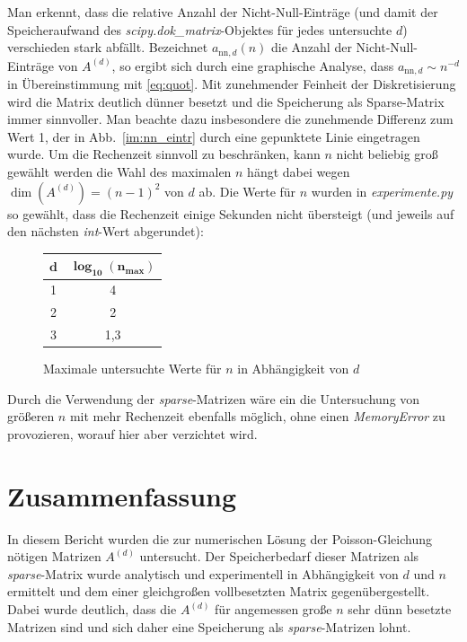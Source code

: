 \documentclass[smallheadings]{scrartcl}
\numberwithin{equation}{section}
\begin{document}
Man erkennt, dass die relative Anzahl der Nicht-Null-Einträge (und damit der Speicheraufwand des \textit{scipy.dok\_matrix}-Objektes für jedes untersuchte $d$) verschieden stark abfällt. Bezeichnet $a_{\text{nn},d}(n)$ die Anzahl der 
Nicht-Null-Einträge von $A^{(d)}$, so ergibt sich durch eine graphische Analyse, dass $a_{\text{nn},d}\sim n^{-d}$ in Übereinstimmung mit \eqref{eq:quot}. Mit zunehmender Feinheit der Diskretisierung wird die Matrix deutlich dünner besetzt und die Speicherung als Sparse-Matrix immer sinnvoller. Man beachte dazu insbesondere die zunehmende Differenz zum Wert 1, der in Abb.~\ref{im:nn_eintr} durch eine gepunktete Linie eingetragen wurde. 
Um die Rechenzeit sinnvoll zu beschränken, kann $n$ nicht beliebig groß gewählt werden die Wahl des maximalen $n$ hängt dabei wegen $\dim(A^{(d)})=(n-1)^2$ von $d$ ab. Die Werte für $n$ wurden in \textit{experimente.py} so gewählt, dass die Rechenzeit einige Sekunden nicht übersteigt (und jeweils auf den nächsten \textit{int}-Wert abgerundet):
\begin{figure}[H]
\centering
\begin{tabular}{|c|c|}
\hline
$\boldsymbol{d}$ & $\boldsymbol{\log_{10}(n_{max})}$\\
\hline
1 & 4\\
\hline
2 & 2\\
\hline
3 & 1,3\\
\hline

\end{tabular}
\caption{Maximale untersuchte Werte für $n$ in Abhängigkeit von $d$}
\end{figure}
Durch die Verwendung der \textit{sparse}-Matrizen wäre ein die Untersuchung von größeren $n$ mit mehr Rechenzeit ebenfalls möglich, ohne einen \textit{MemoryError} zu provozieren, worauf hier aber verzichtet wird.

\section{Zusammenfassung}

In diesem Bericht wurden die zur numerischen Lösung der Poisson-Gleichung nötigen Matrizen $A^{(d)}$ untersucht. Der Speicherbedarf dieser Matrizen als \textit{sparse}-Matrix wurde analytisch und experimentell in Abhängigkeit von $d$ und $n$ ermittelt und dem einer gleichgroßen vollbesetzten Matrix gegenübergestellt. Dabei wurde deutlich, dass die $A^{(d)}$ für angemessen große $n$ sehr dünn besetzte Matrizen sind und sich daher eine Speicherung als \textit{sparse}-Matrizen lohnt. 
\end{document}
